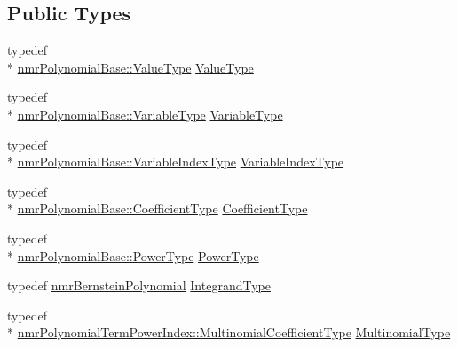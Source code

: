 \subsection*{Public Types}
\begin{DoxyCompactItemize}
\item 
typedef \\*
\hyperlink{classnmr_polynomial_base_a72f0bc16b225e4708bcf15a77ba206e3}{nmr\-Polynomial\-Base\-::\-Value\-Type} \hyperlink{classnmr_bernstein_polynomial_line_integral_ab1d3f80540e0791f359e53b3ef074a86}{Value\-Type}
\item 
typedef \\*
\hyperlink{classnmr_polynomial_base_a666e909572cf22856c965d47f243a633}{nmr\-Polynomial\-Base\-::\-Variable\-Type} \hyperlink{classnmr_bernstein_polynomial_line_integral_a229f7cb4c93c33c1b2a3de23d4f3460b}{Variable\-Type}
\item 
typedef \\*
\hyperlink{classnmr_polynomial_base_aae95477e451ddc7d3ee3f41cbdaadde2}{nmr\-Polynomial\-Base\-::\-Variable\-Index\-Type} \hyperlink{classnmr_bernstein_polynomial_line_integral_a125fa9ed7f5718e92272974aee68b27a}{Variable\-Index\-Type}
\item 
typedef \\*
\hyperlink{classnmr_polynomial_base_a8693efdfc8585ccb49abea69f74f3eef}{nmr\-Polynomial\-Base\-::\-Coefficient\-Type} \hyperlink{classnmr_bernstein_polynomial_line_integral_a0dc7480d6f60af6d3d8da6e32444edf7}{Coefficient\-Type}
\item 
typedef \\*
\hyperlink{classnmr_polynomial_base_a58607c884bf2e6725a77ed4d9e14ba26}{nmr\-Polynomial\-Base\-::\-Power\-Type} \hyperlink{classnmr_bernstein_polynomial_line_integral_a0e07aee2cb7c5f3f5d2c1f95cd4e9abf}{Power\-Type}
\item 
typedef \hyperlink{classnmr_bernstein_polynomial}{nmr\-Bernstein\-Polynomial} \hyperlink{classnmr_bernstein_polynomial_line_integral_a5c7945eacbf7d3d225de9d11bbac138c}{Integrand\-Type}
\item 
typedef \\*
\hyperlink{classnmr_polynomial_term_power_index_a09f482da776cfb829e26ad1fb381ab94}{nmr\-Polynomial\-Term\-Power\-Index\-::\-Multinomial\-Coefficient\-Type} \hyperlink{classnmr_bernstein_polynomial_line_integral_a284a932e77c5c38a5d6959c4992d5300}{Multinomial\-Type}
\end{DoxyCompactItemize}
